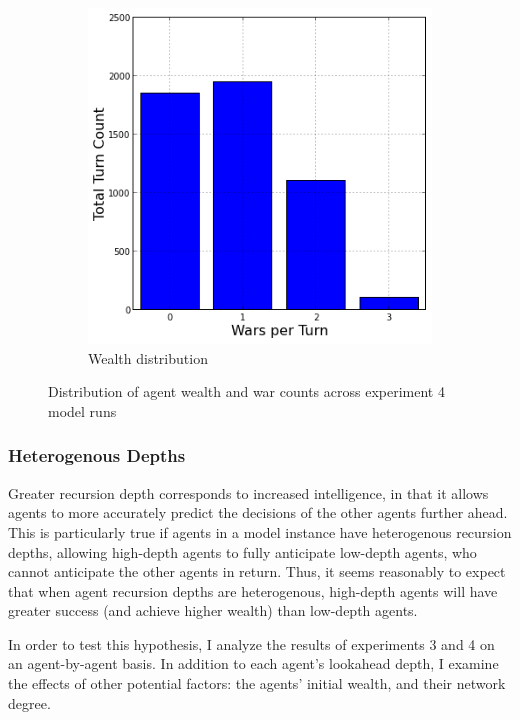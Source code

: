 \documentclass{article}
\begin{document}
\begin{figure}[h!]
\begin{subfigure}{0.49\textwidth}
		\includegraphics[width=\textwidth]{Graphics/Exp4WarDistribution}
		\caption{Wealth distribution}
	\end{subfigure}
\caption{Distribution of agent wealth and war counts across experiment 4 model runs}
\end{figure}


\subsubsection{Heterogenous Depths}

Greater recursion depth corresponds to increased intelligence, in that it allows agents to more accurately predict the decisions of the other agents further ahead. This is particularly true if agents in a model instance have heterogenous recursion depths, allowing high-depth agents to fully anticipate low-depth agents, who cannot anticipate the other agents in return. Thus, it seems reasonably to expect that when agent recursion depths are heterogenous, high-depth agents will have greater success (and achieve higher wealth) than low-depth agents. 

In order to test this hypothesis, I analyze the results of experiments 3 and 4 on an agent-by-agent basis. In addition to each agent's lookahead depth, I examine the effects of other potential factors: the agents' initial wealth, and their network degree.
\end{document}
